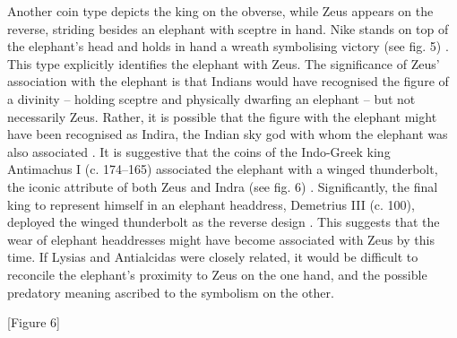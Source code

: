 \documentclass{ijsra}
\begin{document}
Another coin type depicts the king on the obverse, while Zeus appears on the reverse, striding besides an elephant with sceptre in hand. 
Nike stands on top of the elephant’s head and holds in hand a wreath symbolising victory (see fig. 5) \parencite[27]{Narain1991}. 
This type explicitly identifies the elephant with Zeus. 
The significance of Zeus’ association with the elephant is that Indians would have recognised the figure of a divinity
– holding sceptre and physically dwarfing an elephant – but not necessarily Zeus. 
Rather, it is possible that the figure with the elephant might have been recognised as Indira,
the Indian sky god with whom the elephant was also associated \parencite[247]{MacDowall2007b}. 
It is suggestive that the coins of the Indo-Greek king Antimachus I (c. 174--165\BC) associated the elephant with a winged thunderbolt,
the iconic attribute of both Zeus and Indra (see fig. 6) \parencites[242]{MacDowall2007b}[260]{Narain2003}.
Significantly, the final king to represent himself in an elephant headdress, Demetrius III (c. 100\BC),
deployed the winged thunderbolt as the reverse design \parencites[17--18]{Kalita1997}[362]{Sircar2008}.
This suggests that the wear of elephant headdresses might have become associated with Zeus by this time. 
If Lysias and Antialcidas were closely related, it would be difficult to reconcile the elephant’s proximity to Zeus on the one hand,
and the possible predatory meaning ascribed to the symbolism on the other.

[Figure 6]
\end{document}
